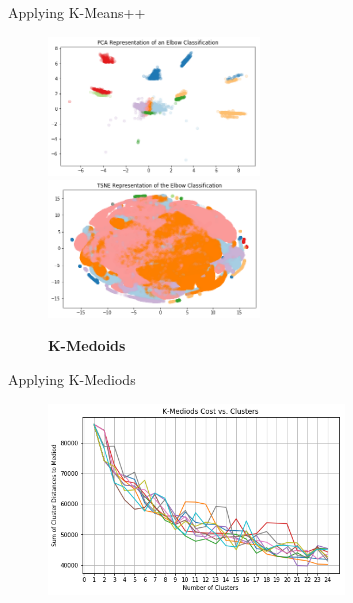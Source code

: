 \documentclass[10pt,xcolor={table,dvipsnames},t]{beamer}
\begin{document}
\begin{frame}{Applying K-Means++}
\begin{figure}
\begin{center}
    \includegraphics[width=0.5\textwidth]{images/kmeans-pca.png}
    \includegraphics[width=0.5\textwidth]{images/kmeans-tsne.png}
\end{center}
\end{figure}
\end{frame}

\begin{frame}
\begin{figure}
\vspace*{9em}
\Huge \textbf{K-Medoids}
\hline
\vspace*{\fill}
\end{figure}
\end{frame}

\begin{frame}{Applying K-Mediods}
\begin{figure}
\begin{center}
    \includegraphics[width=0.7\textwidth]{images/kmed-cost.png}
\end{center}
\end{figure}
\end{frame}
\end{document}
